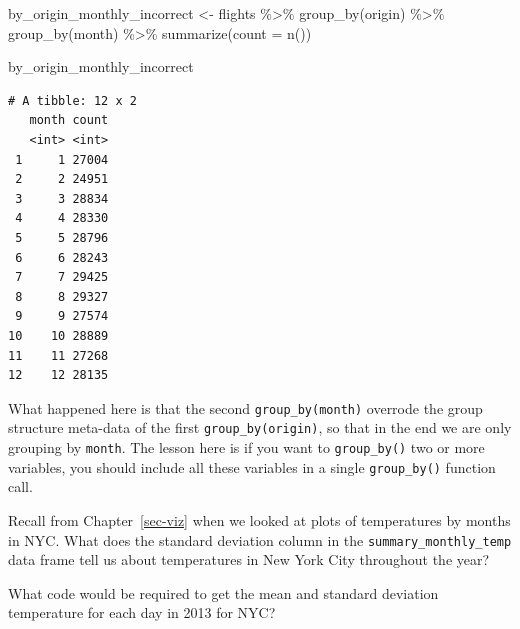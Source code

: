 \documentclass[
  letterpaper,
  DIV=11,
  numbers=noendperiod]{scrreprt}
\newenvironment{Shaded}{\begin{snugshade}}{\end{snugshade}}
\newcommand{\AttributeTok}[1]{\textcolor[rgb]{0.40,0.45,0.13}{#1}}
\newcommand{\FunctionTok}[1]{\textcolor[rgb]{0.28,0.35,0.67}{#1}}
\newcommand{\NormalTok}[1]{\textcolor[rgb]{0.00,0.23,0.31}{#1}}
\newcommand{\OtherTok}[1]{\textcolor[rgb]{0.00,0.23,0.31}{#1}}
\newcommand{\SpecialCharTok}[1]{\textcolor[rgb]{0.37,0.37,0.37}{#1}}
\theoremstyle{definition}
\theoremstyle{remark}
\begin{document}
\begin{Shaded}
\begin{Highlighting}[]
\NormalTok{by\_origin\_monthly\_incorrect }\OtherTok{\textless{}{-}}\NormalTok{ flights }\SpecialCharTok{\%\textgreater{}\%} 
  \FunctionTok{group\_by}\NormalTok{(origin) }\SpecialCharTok{\%\textgreater{}\%} 
  \FunctionTok{group\_by}\NormalTok{(month) }\SpecialCharTok{\%\textgreater{}\%} 
  \FunctionTok{summarize}\NormalTok{(}\AttributeTok{count =} \FunctionTok{n}\NormalTok{())}

\NormalTok{by\_origin\_monthly\_incorrect}
\end{Highlighting}
\end{Shaded}

\begin{verbatim}
# A tibble: 12 x 2
   month count
   <int> <int>
 1     1 27004
 2     2 24951
 3     3 28834
 4     4 28330
 5     5 28796
 6     6 28243
 7     7 29425
 8     8 29327
 9     9 27574
10    10 28889
11    11 27268
12    12 28135
\end{verbatim}

What happened here is that the second \texttt{group\_by(month)} overrode
the group structure meta-data of the first \texttt{group\_by(origin)},
so that in the end we are only grouping by \texttt{month}. The lesson
here is if you want to \texttt{group\_by()} two or more variables, you
should include all these variables in a single \texttt{group\_by()}
function call.

\begin{tcolorbox}[enhanced jigsaw, colback=white, toprule=.15mm, bottomrule=.15mm, titlerule=0mm, title={{🎯} Learning Check 3.5}, leftrule=.75mm, arc=.35mm, left=2mm, colframe=quarto-callout-tip-color-frame, coltitle=black, opacitybacktitle=0.6, bottomtitle=1mm, colbacktitle=quarto-callout-tip-color!10!white, opacityback=0, toptitle=1mm, rightrule=.15mm, breakable]

Recall from Chapter~\ref{sec-viz} when we looked at plots of
temperatures by months in NYC. What does the standard deviation column
in the \texttt{summary\_monthly\_temp} data frame tell us about
temperatures in New York City throughout the year?

\end{tcolorbox}

\begin{tcolorbox}[enhanced jigsaw, colback=white, toprule=.15mm, bottomrule=.15mm, titlerule=0mm, title={{🎯} Learning Check 3.6}, leftrule=.75mm, arc=.35mm, left=2mm, colframe=quarto-callout-tip-color-frame, coltitle=black, opacitybacktitle=0.6, bottomtitle=1mm, colbacktitle=quarto-callout-tip-color!10!white, opacityback=0, toptitle=1mm, rightrule=.15mm, breakable]

What code would be required to get the mean and standard deviation
temperature for each day in 2013 for NYC?

\end{tcolorbox}
\end{document}

